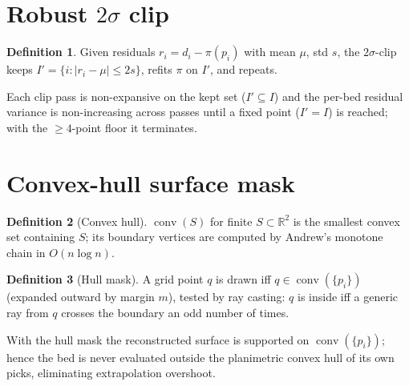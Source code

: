 \documentclass[11pt]{article}
\theoremstyle{definition}\newtheorem{definition}{Definition}[section]
\theoremstyle{plain}\newtheorem{theorem}{Theorem}[section]
\newcommand{\R}{\mathbb{R}}\newcommand{\Z}{\mathbb{Z}}\newcommand{\Norm}[1]{\lVert #1\rVert}
\DeclareMathOperator{\conv}{conv}\DeclareMathOperator*{\argmin}{arg\,min}
\begin{document}
\section{Robust $2\sigma$ clip}
\begin{definition}
Given residuals $r_i=d_i-\pi(p_i)$ with mean $\mu$, std $s$, the $2\sigma$-clip keeps
$I'=\{i: |r_i-\mu|\le 2s\}$, refits $\pi$ on $I'$, and repeats.
\end{definition}
\begin{proposition}
Each clip pass is non-expansive on the kept set ($I'\subseteq I$) and the per-bed residual variance is
non-increasing across passes until a fixed point ($I'=I$) is reached; with the $\ge4$-point floor it
terminates.
\end{proposition}

\section{Convex-hull surface mask}
\begin{definition}[Convex hull]
$\conv(S)$ for finite $S\subset\R^2$ is the smallest convex set containing $S$; its boundary vertices are
computed by Andrew's monotone chain in $O(n\log n)$.
\end{definition}
\begin{definition}[Hull mask]
A grid point $q$ is drawn iff $q\in\conv(\{p_i\})$ (expanded outward by margin $m$), tested by ray casting:
$q$ is inside iff a generic ray from $q$ crosses the boundary an odd number of times.
\end{definition}
\begin{proposition}[No extrapolation]
With the hull mask the reconstructed surface is supported on $\conv(\{p_i\})$; hence the bed is never
evaluated outside the planimetric convex hull of its own picks, eliminating extrapolation overshoot.
\end{proposition}
\end{document}
